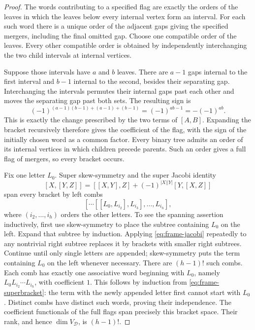 \begin{proof}
The words contributing to a specified flag are exactly the orders of
the leaves in which the leaves below every internal vertex form an
interval.  For each such word there is a unique order of the adjacent
gaps giving the specified mergers, including the final omitted gap.
Choose one compatible order of the leaves.  Every other compatible
order is obtained by independently interchanging the two child
intervals at internal vertices.

Suppose those intervals have $a$ and $b$ leaves.  There are $a-1$ gaps
internal to the first interval and $b-1$ internal to the second, besides
their separating gap.  Interchanging the intervals permutes their
internal gaps past each other and moves the separating gap past both
sets.  The resulting sign is
\[
 (-1)^{(a-1)(b-1)+(a-1)+(b-1)}
   =(-1)^{ab-1}=-(-1)^{ab}.
\]
This is exactly the change prescribed by the two terms of
$[A,B]$.  Expanding the bracket recursively therefore gives the
coefficient of the flag, with the sign of the initially chosen word as
a common factor.  Every binary tree admits an order of its internal
vertices in which children precede parents.  Such an order gives a full
flag of mergers, so every bracket occurs.

Fix one letter $L_0$.  Super skew-symmetry and the super Jacobi identity
\begin{equation}\label{eq:frame-jacobi}
 [X,[Y,Z]]=[[X,Y],Z]+(-1)^{|X||Y|}[Y,[X,Z]]
\end{equation}
span every bracket by left combs
\[
 [\cdots[[L_0,L_{i_2}],L_{i_3}],\ldots,L_{i_h}],
\]
where $(i_2,\ldots,i_h)$ orders the other letters.  To see the spanning
assertion inductively, first use skew-symmetry to place the subtree
containing $L_0$ on the left.  Expand that subtree by induction.
Applying \eqref{eq:frame-jacobi} repeatedly to any nontrivial right
subtree replaces it by brackets with smaller right subtrees.  Continue
until only single letters are appended; skew-symmetry puts the term
containing $L_0$ on the left whenever necessary.
There are $(h-1)!$ such combs.  Each comb has exactly one associative
word beginning with $L_0$, namely
$L_0L_{i_2}\cdots L_{i_h}$, with coefficient $1$.  This follows by
induction from \eqref{eq:frame-superbracket}: the term with the newly
appended letter first cannot start with $L_0$.  Distinct combs have
distinct such words, proving their independence.  The coefficient
functionals of the full flags span precisely this bracket space.
Their rank, and hence $\dim V_{\mathcal D}$, is $(h-1)!$.
\end{proof}

